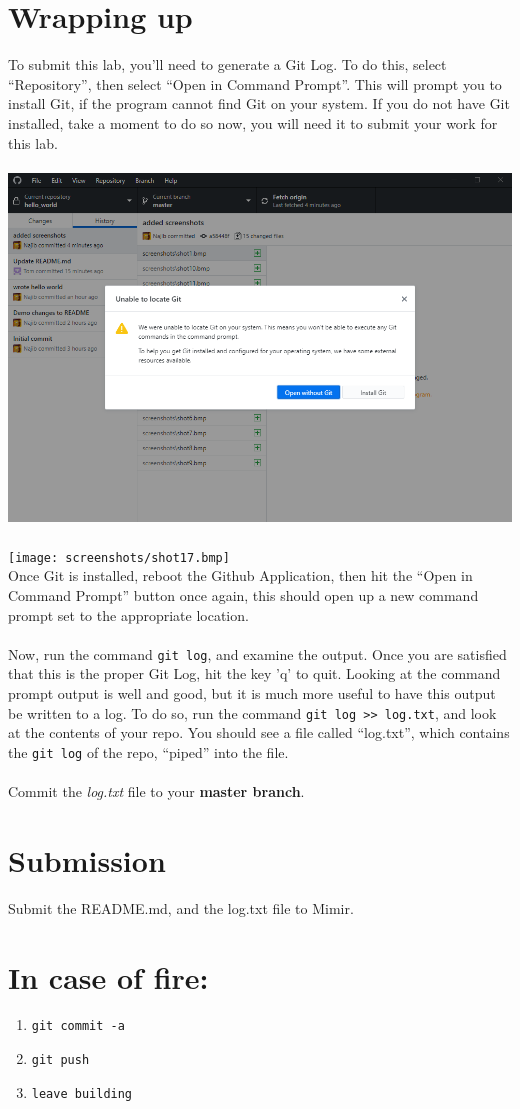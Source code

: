 \documentclass[12pt, letter]{article}
\begin{document}
    \section{Wrapping up}
    To submit this lab, you'll need to generate a Git Log. To do this, select ``Repository'', then select ``Open in Command Prompt''. This will prompt you to install Git, if the program cannot find Git on your system. If you do not have Git installed, take a moment to do so now, you will need it to submit your work for this lab. \\ \\ %
    \includegraphics{screenshots/shot16.bmp} \\ \\
    \texttt{[image: screenshots/shot17.bmp]}
    \\
    Once Git is installed, reboot the Github Application, then hit the ``Open in Command Prompt'' button once again, this should open up a new command prompt set to the appropriate location. 
    \\ \\
    Now, run the command \verb|git log|, and examine the output. Once you are satisfied that this is the proper Git Log, hit the key 'q' to quit. Looking at the command prompt output is well and good, but it is much more useful to have this output be written to a log. To do so, run the command \verb|git log >> log.txt|, and look at the contents of your repo. You should see a file called ``log.txt'', which contains the \verb|git log| of the repo, ``piped'' into the file. 
    \\ \\
    Commit the \emph{log.txt} file to your \textbf{master branch}.
    \section{Submission}
    Submit the README.md, and the log.txt file to Mimir.

    \section{In case of fire:}
    \begin{enumerate}
        \item \texttt{git commit -a}

        \item \texttt{git push}

        \item \texttt{leave building}
    \end{enumerate}
\end{document}
